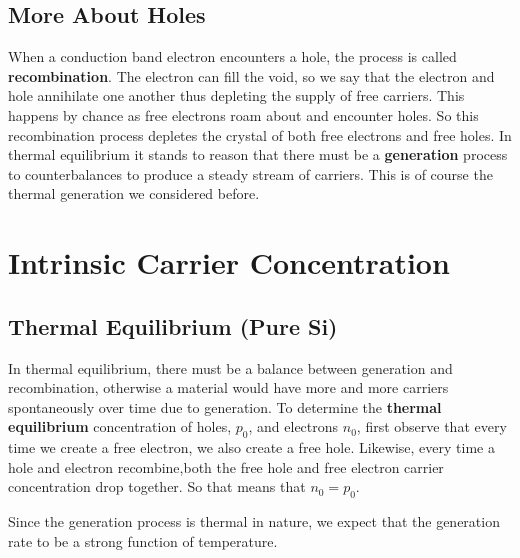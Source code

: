 \subsection{More About Holes}
When a conduction band electron encounters a hole, the process is called \textbf{recombination}.  The electron can fill the void, so we say that the electron and hole annihilate one another thus depleting the supply of free carriers.  This happens by chance as free electrons roam about and encounter holes.  So this recombination process depletes the crystal of both free electrons and free holes.  In thermal equilibrium it stands to reason that there must be a \textbf{generation} process to counterbalances to produce a steady stream of carriers.  This is of course the thermal generation we considered before.
\section{Intrinsic Carrier Concentration}
\subsection{Thermal Equilibrium (Pure Si)}
In thermal equilibrium, there must be a balance between generation and recombination, otherwise a material would have more and more carriers spontaneously over time due to generation.  To determine the \textbf{thermal equilibrium} concentration of holes, $p_0$, and electrons $n_0$, first observe that  every time we create a free electron, we also create a free hole.  Likewise, every time a hole and electron recombine,both the free hole and free electron carrier concentration drop together.  So that means that $n_0 =  p_0 $.

Since the generation process is thermal in nature, we expect that the generation rate to be a strong function of temperature.

